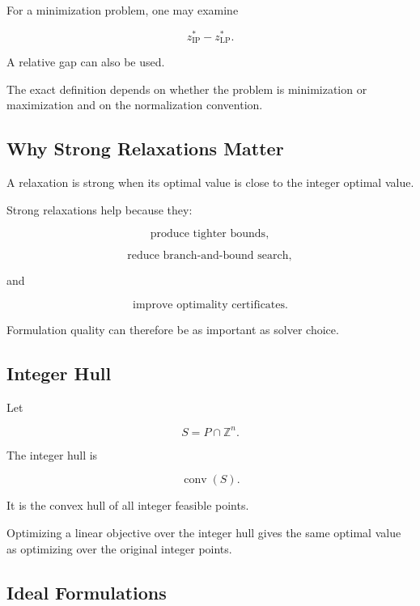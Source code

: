 For a minimization problem, one may examine

\[
\boxed{
z_{\mathrm{IP}}^*
-
z_{\mathrm{LP}}^*.
}
\]

A relative gap can also be used.

The exact definition depends on whether the problem is minimization or
maximization and on the normalization convention.

\subsection{Why Strong Relaxations Matter}
\label{subsec:strong-relaxations}

A relaxation is strong when its optimal value is close to the integer
optimal value.

Strong relaxations help because they:

\[
\boxed{
\text{produce tighter bounds},
}
\]

\[
\boxed{
\text{reduce branch-and-bound search},
}
\]

and

\[
\boxed{
\text{improve optimality certificates}.
}
\]

Formulation quality can therefore be as important as solver choice.

\subsection{Integer Hull}
\label{subsec:integer-hull}

Let

\[
S
=
P\cap\mathbb{Z}^n.
\]

The integer hull is

\[
\boxed{
\operatorname{conv}(S).
}
\]

It is the convex hull of all integer feasible points.

Optimizing a linear objective over the integer hull gives the same optimal
value as optimizing over the original integer points.

\subsection{Ideal Formulations}
\label{subsec:ideal-integer-formulations}

